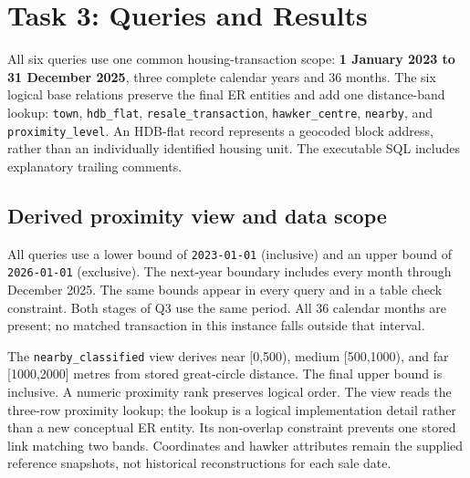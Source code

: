 \captionsetup{font=small,skip=7pt}
\setlength{\parindent}{0pt}
\setlength{\parskip}{5pt}
\setlength{\textfloatsep}{12pt}
\setlength{\intextsep}{12pt}
\raggedbottom
\section{Task 3: Queries and Results}
\begin{samepage}All six queries use one common housing-transaction scope: \textbf{1 January 2023 to 31 December 2025}, three complete calendar years and 36 months. The six logical base relations preserve the final ER entities and add one distance-band lookup: \texttt{town}, \texttt{hdb\_flat}, \texttt{resale\_transaction}, \texttt{hawker\_centre}, \texttt{nearby}, and \texttt{proximity\_level}. An HDB-flat record represents a geocoded block address, rather than an individually identified housing unit. The executable SQL includes explanatory trailing comments.\par\end{samepage}

\subsection{Derived proximity view and data scope}
\begin{samepage}All queries use a lower bound of \texttt{2023-01-01} (inclusive) and an upper bound of \texttt{2026-01-01} (exclusive). The next-year boundary includes every month through December 2025. The same bounds appear in every query and in a table check constraint. Both stages of Q3 use the same period. All 36 calendar months are present; no matched transaction in this instance falls outside that interval.\par\end{samepage}

\begin{samepage}The \texttt{nearby\_classified} view derives near [0,500), medium [500,1000), and far [1000,2000] metres from stored great-circle distance. The final upper bound is inclusive. A numeric proximity rank preserves logical order. The view reads the three-row proximity lookup; the lookup is a logical implementation detail rather than a new conceptual ER entity. Its non-overlap constraint prevents one stored link matching two bands. Coordinates and hawker attributes remain the supplied reference snapshots, not historical reconstructions for each sale date.\par\end{samepage}

